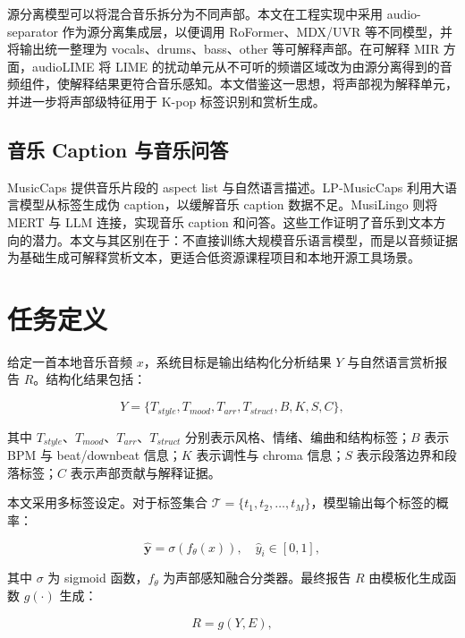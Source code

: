 \documentclass[UTF8,zihao=-4]{ctexart}
\begin{document}
源分离模型可以将混合音乐拆分为不同声部。本文在工程实现中采用 audio-separator 作为源分离集成层，以便调用 RoFormer、MDX/UVR 等不同模型，并将输出统一整理为 vocals、drums、bass、other 等可解释声部。在可解释 MIR 方面，audioLIME 将 LIME 的扰动单元从不可听的频谱区域改为由源分离得到的音频组件，使解释结果更符合音乐感知\cite{haunschmid2020audiolime}。本文借鉴这一思想，将声部视为解释单元，并进一步将声部级特征用于 K-pop 标签识别和赏析生成。

\subsection{音乐 Caption 与音乐问答}

MusicCaps 提供音乐片段的 aspect list 与自然语言描述\cite{musiccaps2023}。LP-MusicCaps 利用大语言模型从标签生成伪 caption，以缓解音乐 caption 数据不足\cite{doh2023lpmusiccaps}。MusiLingo 则将 MERT 与 LLM 连接，实现音乐 caption 和问答\cite{deng2023musilingo}。这些工作证明了音乐到文本方向的潜力。本文与其区别在于：不直接训练大规模音乐语言模型，而是以音频证据为基础生成可解释赏析文本，更适合低资源课程项目和本地开源工具场景。

\section{任务定义}

给定一首本地音乐音频 $x$，系统目标是输出结构化分析结果 $Y$ 与自然语言赏析报告 $R$。结构化结果包括：

\begin{equation}
Y = \{T_{style}, T_{mood}, T_{arr}, T_{struct}, B, K, S, C\},
\end{equation}

其中 $T_{style}$、$T_{mood}$、$T_{arr}$、$T_{struct}$ 分别表示风格、情绪、编曲和结构标签；$B$ 表示 BPM 与 beat/downbeat 信息；$K$ 表示调性与 chroma 信息；$S$ 表示段落边界和段落标签；$C$ 表示声部贡献与解释证据。

本文采用多标签设定。对于标签集合 $\mathcal{T}=\{t_1,t_2,\dots,t_M\}$，模型输出每个标签的概率：

\begin{equation}
\hat{\bm{y}} = \sigma(f_\theta(x)), \quad \hat{y}_i \in [0,1],
\end{equation}

其中 $\sigma$ 为 sigmoid 函数，$f_\theta$ 为声部感知融合分类器。最终报告 $R$ 由模板化生成函数 $g(\cdot)$ 生成：

\begin{equation}
R = g(Y, E),
\end{equation}
\end{document}
